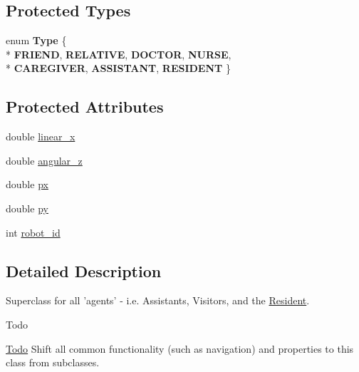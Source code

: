 \subsection*{Protected Types}
\begin{DoxyCompactItemize}
\item 
enum {\bfseries Type} \{ \\*
{\bfseries F\-R\-I\-E\-N\-D}, 
{\bfseries R\-E\-L\-A\-T\-I\-V\-E}, 
{\bfseries D\-O\-C\-T\-O\-R}, 
{\bfseries N\-U\-R\-S\-E}, 
\\*
{\bfseries C\-A\-R\-E\-G\-I\-V\-E\-R}, 
{\bfseries A\-S\-S\-I\-S\-T\-A\-N\-T}, 
{\bfseries R\-E\-S\-I\-D\-E\-N\-T}
 \}
\end{DoxyCompactItemize}
\subsection*{Protected Attributes}
\begin{DoxyCompactItemize}
\item 
double \hyperlink{classAgent_a77dfc60513d8c90b2848297e09fffba7}{linear\-\_\-x}
\item 
double \hyperlink{classAgent_affc842049c5010a5f8bd99a62d650a25}{angular\-\_\-z}
\item 
double \hyperlink{classAgent_af51536ae3b511b53726b84b9226cc772}{px}
\item 
double \hyperlink{classAgent_a048e8b32d02a2fd58f046a444a287015}{py}
\item 
int \hyperlink{classAgent_aefcf2085a669d7e91d932e7cc3ee88ce}{robot\-\_\-id}
\end{DoxyCompactItemize}


\subsection{Detailed Description}
Superclass for all 'agents' -\/ i.\-e. Assistants, Visitors, and the \hyperlink{classResident}{Resident}. 

\begin{DoxyRefDesc}{Todo}
\item[\hyperlink{todo__todo000001}{Todo}]Shift all common functionality (such as navigation) and properties to this class from subclasses.\end{DoxyRefDesc}


